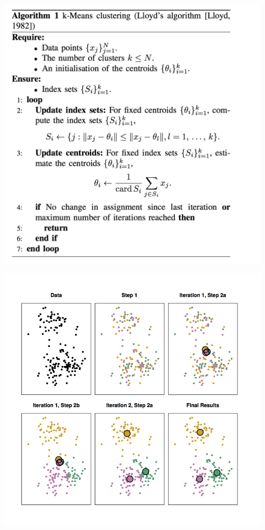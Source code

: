 \documentclass[12pt]{beamer}
\begin{document}
\begin{frame}
	\begin{center}
		\vspace{3 mm}
		\includegraphics[scale=0.40]{../figures/Kmeans_Algorithm.png}
	\end{center}
\end{frame}

\begin{frame}
	\begin{center}
		\vspace{-3 mm}
		\includegraphics[scale=0.5]{../figures/Kmeans_example.png}
	\end{center}
\end{frame}
\end{document}
